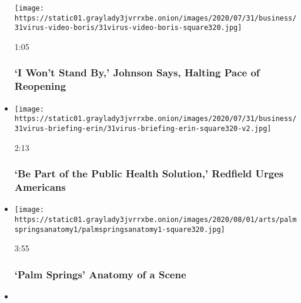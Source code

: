 \begin{itemize}
  \texttt{[image: https://static01.graylady3jvrrxbe.onion/images/2020/07/31/business/31virus-video-boris/31virus-video-boris-square320.jpg]}

  1:05

  \hypertarget{i-wont-stand-by-johnson-says-halting-pace-of-reopening}{%
  \subsubsection{`I Won't Stand By,' Johnson Says, Halting Pace of
  Reopening}\label{i-wont-stand-by-johnson-says-halting-pace-of-reopening}}
\item
  \href{https://www.nytimes3xbfgragh.onion/video/us/politics/100000007266691/fauci-congress-testimony.html?action=click\&module=video-series-bar\&region=header\&pgtype=Article\&playlistId=video/latest-video}{}

  \texttt{[image: https://static01.graylady3jvrrxbe.onion/images/2020/07/31/business/31virus-briefing-erin/31virus-briefing-erin-square320-v2.jpg]}

  2:13

  \hypertarget{be-part-of-the-public-health-solution-redfield-urges-americans}{%
  \subsubsection{`Be Part of the Public Health Solution,' Redfield Urges
  Americans}\label{be-part-of-the-public-health-solution-redfield-urges-americans}}
\item
  \href{https://www.nytimes3xbfgragh.onion/video/movies/100000007265338/palm-springs-scene.html?action=click\&module=video-series-bar\&region=header\&pgtype=Article\&playlistId=video/latest-video}{}

  \texttt{[image: https://static01.graylady3jvrrxbe.onion/images/2020/08/01/arts/palmspringsanatomy1/palmspringsanatomy1-square320.jpg]}

  3:55

  \hypertarget{palm-springs--anatomy-of-a-scene}{%
  \subsubsection{`Palm Springs' \textbar{} Anatomy of a
  Scene}\label{palm-springs--anatomy-of-a-scene}}
\item
  \href{https://www.nytimes3xbfgragh.onion/video/us/politics/100000007265038/trump-inhofe-audio-call.html?action=click\&module=video-series-bar\&region=header\&pgtype=Article\&playlistId=video/latest-video}{}


\end{itemize}
